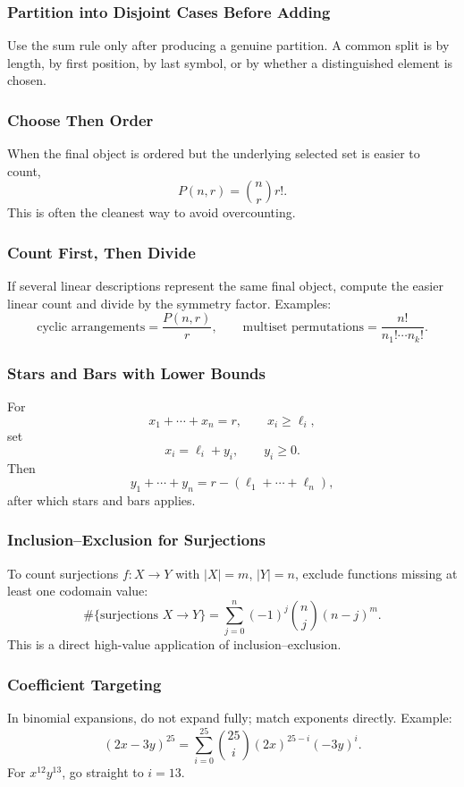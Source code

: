 \documentclass[12pt]{article}
\begin{document}
\subsubsection{Partition into Disjoint Cases Before Adding}
Use the sum rule only after producing a genuine partition.
A common split is by length, by first position, by last symbol, or by whether a distinguished element is chosen.

\subsubsection{Choose Then Order}
When the final object is ordered but the underlying selected set is easier to count,
\[
P(n,r)=\binom{n}{r}r!.
\]
This is often the cleanest way to avoid overcounting.

\subsubsection{Count First, Then Divide}
If several linear descriptions represent the same final object, compute the easier linear count and divide by the symmetry factor.
Examples:
\[
\text{cyclic arrangements}=\frac{P(n,r)}{r},
\qquad
\text{multiset permutations}=\frac{n!}{n_1!\cdots n_k!}.
\]

\subsubsection{Stars and Bars with Lower Bounds}
For
\[
x_1+\cdots+x_n=r,
\qquad x_i\ge \ell_i,
\]
set
\[
x_i=\ell_i+y_i,\qquad y_i\ge 0.
\]
Then
\[
y_1+\cdots+y_n=r-(\ell_1+\cdots+\ell_n),
\]
after which stars and bars applies.

\subsubsection{Inclusion--Exclusion for Surjections}
To count surjections \(f:X\to Y\) with \(|X|=m\), \(|Y|=n\), exclude functions missing at least one codomain value:
\[
\#\{\text{surjections }X\to Y\}
=
\sum_{j=0}^{n}(-1)^j\binom{n}{j}(n-j)^m.
\]
This is a direct high-value application of inclusion--exclusion.

\subsubsection{Coefficient Targeting}
In binomial expansions, do not expand fully; match exponents directly.
Example:
\[
(2x-3y)^{25}
=
\sum_{i=0}^{25}\binom{25}{i}(2x)^{25-i}(-3y)^i.
\]
For \(x^{12}y^{13}\), go straight to \(i=13\).
\end{document}
